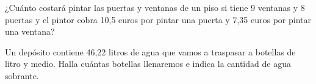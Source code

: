 \documentclass[addpoints,spanish, 12pt,a4paper]{exam}
\renewcommand*\half{.5}
\begin{document}
\begin{questions}
\question[2] ¿Cuánto costará pintar las puertas y ventanas de un piso si tiene 9 ventanas y 8 puertas y el pintor cobra 10,5 euros por pintar una puerta y 7,35 euros por pintar una ventana?
\vspace{40pt}\vspace{90pt}


\question[2] Un depósito contiene 46,22 litros de agua que vamos a traspasar a botellas de litro y medio. Halla cuántas botellas
llenaremos e indica la cantidad de agua sobrante.




\end{questions}
\end{document}
